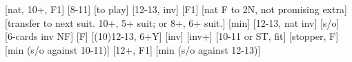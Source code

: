 \begin{bidsemi}
[nat, 10+, F1]
    [8-11]
        [to play]
    [12-13, inv]
    [F1]
    [nat F to 2N, not promising extra]
[transfer to next suit. 10+, 5+ suit; or 8+, 6+ suit.]
    [min]
        [12-13, nat inv]
        [s/o]
        [6-cards inv NF]
        [F]
    [(10)12-13, 6+Y]
    [inv]
    [inv+]
[10-11 or ST, fit]
    [stopper, F]
    [min (s/o against 10-11)]
[12+, F1]
    [min (s/o against 12-13)]
\end{bidsemi}